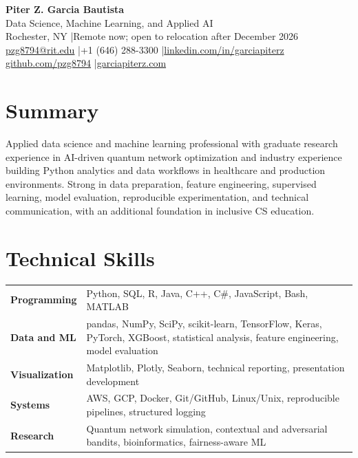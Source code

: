 \documentclass[10pt,letterpaper]{article}
\begin{document}
\fontsize{9}{10.4}\selectfont

\begin{center}
  {\Large\bfseries Piter Z. Garcia Bautista}\\[1pt]
  {\large Data Science, Machine Learning, and Applied AI}\\[2pt]
  Rochester, NY \enspace|\enspace Remote now; open to relocation after December 2026\\
  \href{mailto:pzg8794@rit.edu}{pzg8794@rit.edu}
  \enspace|\enspace +1 (646) 288-3300
  \enspace|\enspace \href{https://linkedin.com/in/garciapiterz}{linkedin.com/in/garciapiterz}\\
  \href{https://github.com/pzg8794}{github.com/pzg8794}
  \enspace|\enspace \href{https://garciapiterz.com}{garciapiterz.com}
\end{center}

\section*{Summary}
Applied data science and machine learning professional with graduate research
experience in AI-driven quantum network optimization and industry experience
building Python analytics and data workflows in healthcare and production
environments. Strong in data preparation, feature engineering, supervised
learning, model evaluation, reproducible experimentation, and technical
communication, with an additional foundation in inclusive CS education.

\section*{Technical Skills}
\begin{tabularx}{\textwidth}{@{}>{\bfseries}l X@{}}
Programming & Python, SQL, R, Java, C++, C\#, JavaScript, Bash, MATLAB\\
Data and ML & pandas, NumPy, SciPy, scikit-learn, TensorFlow, Keras, PyTorch, XGBoost, statistical analysis, feature engineering, model evaluation\\
Visualization & Matplotlib, Plotly, Seaborn, technical reporting, presentation development\\
Systems & AWS, GCP, Docker, Git/GitHub, Linux/Unix, reproducible pipelines, structured logging\\
Research & Quantum network simulation, contextual and adversarial bandits, bioinformatics, fairness-aware ML\\
\end{tabularx}
\end{document}
